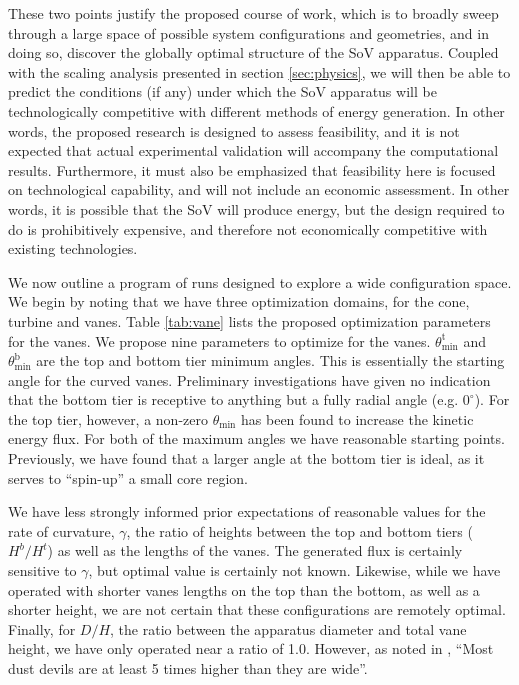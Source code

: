 These two points justify the proposed course of work, which is to
broadly sweep through a large space of possible system configurations
and geometries, and in doing so, discover the globally optimal structure
of the SoV apparatus. Coupled with the scaling analysis presented in
section \ref{sec:physics}, we will then be able to predict the
conditions (if any) under which the SoV apparatus will be
technologically competitive with different methods of energy
generation. In other words, the proposed research is designed to assess
feasibility, and it is not expected that actual experimental validation
will accompany the computational results. Furthermore, it must also be
emphasized that feasibility here is focused on technological capability,
and will not include an economic assessment. In other words, it is
possible that the SoV will produce energy, but the design required to do
is prohibitively expensive, and therefore not economically competitive
with existing technologies. 

%
%
We now outline a program of runs designed to explore a wide
configuration space. We begin by noting that we have three 
optimization domains, for the cone, turbine and vanes. Table
\ref{tab:vane} lists the proposed optimization parameters for the
vanes. We propose nine parameters to optimize for the
vanes. $\theta^{\text{t}}_{\text{min}}$ and
$\theta^{\text{b}}_{\text{min}}$ are the top and bottom tier minimum
angles. This is essentially the starting angle for the curved
vanes. Preliminary investigations have given no indication that the
bottom tier is receptive to anything but a fully radial angle
(e.g. $0^{\circ}$). For the top tier, however, a non-zero
$\theta_{\text{min}}$ has been found to increase the kinetic energy
flux. For both of the maximum angles we have reasonable starting
points. Previously, we have found that a larger angle at the bottom tier
is ideal, as it serves to ``spin-up'' a small core region.

We have less strongly informed prior expectations of reasonable values
for the rate of curvature, $\gamma$, the ratio of heights between the
top and bottom tiers ($H^b/H^t$) as well as the lengths of the
vanes. The generated flux is certainly sensitive to $\gamma$, but
optimal value is certainly not known. Likewise, while we have operated
with shorter vanes lengths on the top than the bottom, as well as a
shorter height, we are not certain that these configurations are
remotely optimal. Finally, for $D/H$, the ratio between the apparatus
diameter and total vane height, we have only operated near a ratio of
1.0. However, as noted in \cite{ROG:ROG1635}, ``Most dust devils are at 
least 5 times higher than they are wide''.  


